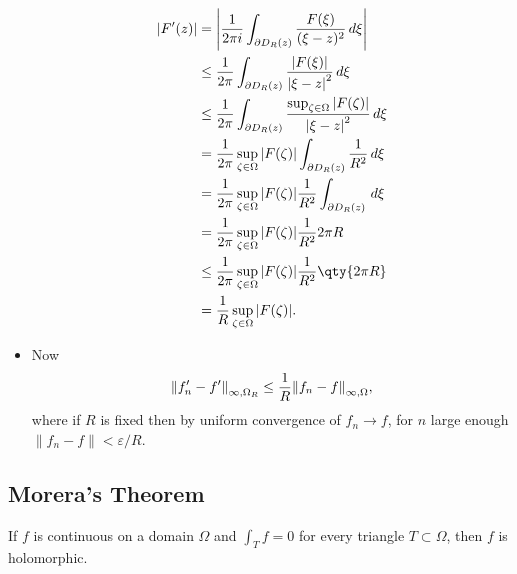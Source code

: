 \begin{solution}
\begin{itemize}
  \begin{align*}
  {\left\lvert {F'(z)} \right\rvert} 
  &= {\left\lvert { {1\over 2\pi i} \int_{{{\partial}}D_R(z)} {F(\xi) \over (\xi-z)^2 } \,d\xi} \right\rvert} \\
  &\leq {1\over 2\pi} \int_{{{\partial}}D_R(z)} { { {\left\lvert {F(\xi)} \right\rvert} \over {\left\lvert {\xi-z} \right\rvert}^2 }} \,d\xi\\
  &\leq {1\over 2\pi} \int_{{{\partial}}D_R(z)} { { \sup_{\zeta\in \Omega} {\left\lvert {F(\zeta)} \right\rvert} \over {\left\lvert {\xi-z} \right\rvert}^2 }} \,d\xi\\
  &= {1\over 2\pi} \sup_{\zeta\in \Omega} {\left\lvert {F(\zeta)} \right\rvert}  \int_{{{\partial}}D_R(z)} { { 1 \over R^2 }} \,d\xi\\
  &= {1\over 2\pi} \sup_{\zeta\in \Omega} {\left\lvert {F(\zeta)} \right\rvert}  {1\over R^2} \int_{{{\partial}}D_R(z)} \,d\xi\\
  &= {1\over 2\pi} \sup_{\zeta\in \Omega} {\left\lvert {F(\zeta)} \right\rvert}  {1\over R^2} 2\pi R   \\
  &\leq {1\over 2\pi} \sup_{\zeta\in \Omega} {\left\lvert {F(\zeta)} \right\rvert}  {1\over R^2}\qty{ 2\pi R}   \\
  &= {1\over R} \sup_{\zeta \in \Omega}{\left\lvert {F(\zeta)} \right\rvert}
  .\end{align*}
\item
  Now
  \begin{align*}
  {\left\lVert {f_n' - f'} \right\rVert}_{\infty, \Omega_R} \leq {1\over R} {\left\lVert {f_n - f} \right\rVert}_{\infty, \Omega}
  ,\end{align*}
  where if \(R\) is fixed then by uniform convergence of \(f_n\to f\),
  for \(n\) large enough
  \({\left\lVert {f_n - f} \right\rVert} < \varepsilon/R\).
\end{itemize}

\end{solution}

\hypertarget{moreras-theorem}{%
\subsection{Morera's Theorem}\label{moreras-theorem}}

\begin{theorem}\label{Morera}

If \(f\) is continuous on a domain \(\Omega\) and \(\int_T f = 0\) for
every triangle \(T\subset \Omega\), then \(f\) is holomorphic.

\end{theorem}

